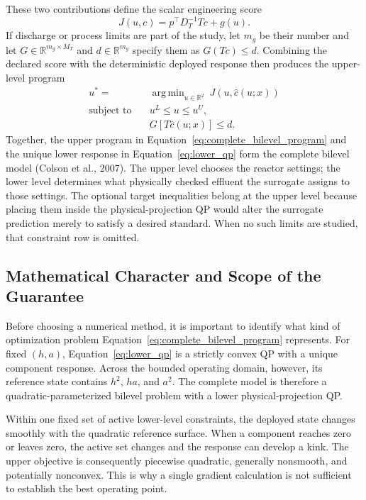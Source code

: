 \documentclass[a4paper,fleqn]{cas-sc}
\DeclareMathOperator*{\argminop}{arg\,min}
\newcommand{\R}{\mathbb{R}}
\begin{document}
These two contributions define the scalar engineering score
\begin{equation}
\label{eq:scalar_objective}
J(u,c)=p^\top D_T^{-1}Tc+g(u).
\end{equation}
If discharge or process limits are part of the study, let $m_g$ be their number and let $G\in\R^{m_g\times M_T}$ and $d\in\R^{m_g}$ specify them as $G(Tc)\leq d$. Combining the declared score with the deterministic deployed response then produces the upper-level program
\begin{equation}
\label{eq:complete_bilevel_program}
\begin{aligned}
u^*={}&
\argminop_{u\in\R^2}\ J(u,\widehat c(u;x))\\
\text{subject to}\quad {}&u^L\leq u\leq u^U,\\
&G[T\widehat c(u;x)]\leq d.
\end{aligned}
\end{equation}
Together, the upper program in Equation~\eqref{eq:complete_bilevel_program} and the unique lower response in Equation~\eqref{eq:lower_qp} form the complete bilevel model (Colson et al., 2007). The upper level chooses the reactor settings; the lower level determines what physically checked effluent the surrogate assigns to those settings. The optional target inequalities belong at the upper level because placing them inside the physical-projection QP would alter the surrogate prediction merely to satisfy a desired standard. When no such limits are studied, that constraint row is omitted.

\subsection{Mathematical Character and Scope of the Guarantee}

Before choosing a numerical method, it is important to identify what kind of optimization problem Equation~\eqref{eq:complete_bilevel_program} represents. For fixed $(h,a)$, Equation~\eqref{eq:lower_qp} is a strictly convex QP with a unique component response. Across the bounded operating domain, however, its reference state contains $h^2$, $ha$, and $a^2$. The complete model is therefore a quadratic-parameterized bilevel problem with a lower physical-projection QP.

Within one fixed set of active lower-level constraints, the deployed state changes smoothly with the quadratic reference surface. When a component reaches zero or leaves zero, the active set changes and the response can develop a kink. The upper objective is consequently piecewise quadratic, generally nonsmooth, and potentially nonconvex. This is why a single gradient calculation is not sufficient to establish the best operating point.
\end{document}
